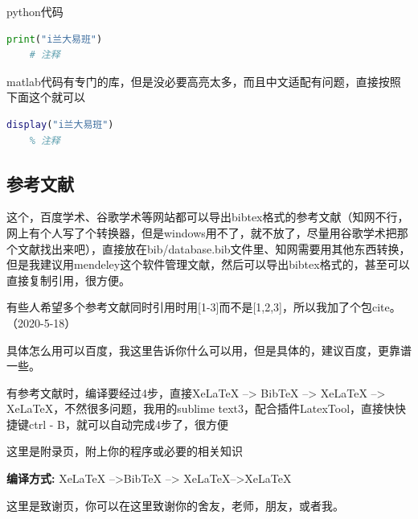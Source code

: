 \documentclass[AutoFakeBold]{LZUThesis2007}
\begin{document}
python代码
\begin{lstlisting}[language = python]
    print("i兰大易班")
    # 注释
\end{lstlisting}

matlab代码有专门的库，但是没必要高亮太多，而且中文适配有问题，直接按照下面这个就可以
\begin{lstlisting}[language = matlab]
    display("i兰大易班")
    % 注释
\end{lstlisting}


\subsection{参考文献} %
\label{sub:参考文献}

这个，百度学术、谷歌学术等网站都可以导出bibtex格式的参考文献（知网不行，网上有个人写了个转换器，但是windows用不了，就不放了，尽量用谷歌学术把那个文献找出来吧），直接放在bib/database.bib文件里、知网需要用其他东西转换，但是我建议用mendeley这个软件管理文献，然后可以导出bibtex格式的，甚至可以直接复制引用，很方便\cite{partl2016, tenne1992polyhedral, tussyadiah2015hotels}。

有些人希望多个参考文献同时引用时用[1-3]而不是[1,2,3]，所以我加了个包cite。（2020-5-18）

具体怎么用可以百度，我这里告诉你什么可以用，但是具体的，建议百度，更靠谱一些。


有参考文献时，编译要经过4步，直接XeLaTeX --> BibTeX --> XeLaTeX --> XeLaTeX，不然很多问题，我用的sublime text3，配合插件LatexTool，直接快快捷键ctrl - B，就可以自动完成4步了，很方便






\backmatter


\printbib



\Appendix


这里是附录页，附上你的程序或必要的相关知识

{\bfseries 编译方式:} XeLaTeX -->BibTeX --> XeLaTeX-->XeLaTeX


\Thanks

这里是致谢页，你可以在这里致谢你的舍友，老师，朋友，或者我。








\Grade %
\end{document}
